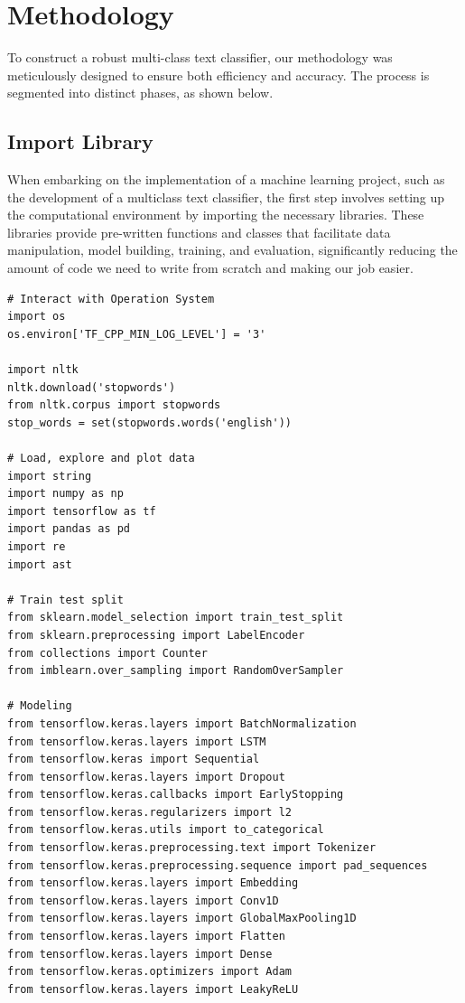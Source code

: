 \section{Methodology}

To construct a robust multi-class text classifier, our methodology was meticulously designed to ensure both efficiency and accuracy. The process is segmented into distinct phases, as shown below.

\subsection{Import Library}
When embarking on the implementation of a machine learning project, such as the development of a multiclass text classifier, the first step involves setting up the computational environment by importing the necessary libraries. These libraries provide pre-written functions and classes that facilitate data manipulation, model building, training, and evaluation, significantly reducing the amount of code we need to write from scratch and making our job easier.\\

\begin{lstlisting}
# Interact with Operation System
import os
os.environ['TF_CPP_MIN_LOG_LEVEL'] = '3'

import nltk
nltk.download('stopwords')
from nltk.corpus import stopwords
stop_words = set(stopwords.words('english'))

# Load, explore and plot data
import string
import numpy as np
import tensorflow as tf
import pandas as pd
import re
import ast

# Train test split
from sklearn.model_selection import train_test_split
from sklearn.preprocessing import LabelEncoder
from collections import Counter
from imblearn.over_sampling import RandomOverSampler

# Modeling
from tensorflow.keras.layers import BatchNormalization
from tensorflow.keras.layers import LSTM
from tensorflow.keras import Sequential
from tensorflow.keras.layers import Dropout
from tensorflow.keras.callbacks import EarlyStopping
from tensorflow.keras.regularizers import l2
from tensorflow.keras.utils import to_categorical
from tensorflow.keras.preprocessing.text import Tokenizer
from tensorflow.keras.preprocessing.sequence import pad_sequences
from tensorflow.keras.layers import Embedding
from tensorflow.keras.layers import Conv1D
from tensorflow.keras.layers import GlobalMaxPooling1D
from tensorflow.keras.layers import Flatten
from tensorflow.keras.layers import Dense
from tensorflow.keras.optimizers import Adam
from tensorflow.keras.layers import LeakyReLU
\end{lstlisting}


